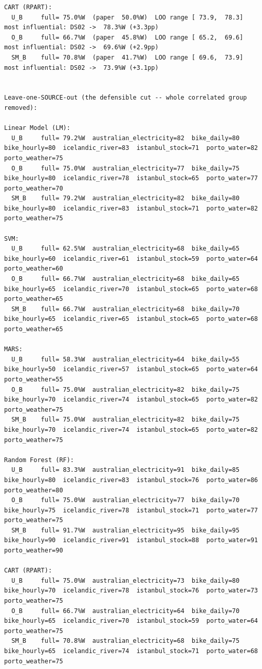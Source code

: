 \begin{verbatim}
CART (RPART):
  U_B     full= 75.0%W  (paper  50.0%W)  LOO range [ 73.9,  78.3]  most influential: DS02 ->  78.3%W (+3.3pp)
  O_B     full= 66.7%W  (paper  45.8%W)  LOO range [ 65.2,  69.6]  most influential: DS02 ->  69.6%W (+2.9pp)
  SM_B    full= 70.8%W  (paper  41.7%W)  LOO range [ 69.6,  73.9]  most influential: DS02 ->  73.9%W (+3.1pp)


Leave-one-SOURCE-out (the defensible cut -- whole correlated group removed):

Linear Model (LM):
  U_B     full= 79.2%W  australian_electricity=82  bike_daily=80  bike_hourly=80  icelandic_river=83  istanbul_stock=71  porto_water=82  porto_weather=75
  O_B     full= 75.0%W  australian_electricity=77  bike_daily=75  bike_hourly=80  icelandic_river=78  istanbul_stock=65  porto_water=77  porto_weather=70
  SM_B    full= 79.2%W  australian_electricity=82  bike_daily=80  bike_hourly=80  icelandic_river=83  istanbul_stock=71  porto_water=82  porto_weather=75

SVM:
  U_B     full= 62.5%W  australian_electricity=68  bike_daily=65  bike_hourly=60  icelandic_river=61  istanbul_stock=59  porto_water=64  porto_weather=60
  O_B     full= 66.7%W  australian_electricity=68  bike_daily=65  bike_hourly=65  icelandic_river=70  istanbul_stock=65  porto_water=68  porto_weather=65
  SM_B    full= 66.7%W  australian_electricity=68  bike_daily=70  bike_hourly=65  icelandic_river=65  istanbul_stock=65  porto_water=68  porto_weather=65

MARS:
  U_B     full= 58.3%W  australian_electricity=64  bike_daily=55  bike_hourly=50  icelandic_river=57  istanbul_stock=65  porto_water=64  porto_weather=55
  O_B     full= 75.0%W  australian_electricity=82  bike_daily=75  bike_hourly=70  icelandic_river=74  istanbul_stock=65  porto_water=82  porto_weather=75
  SM_B    full= 75.0%W  australian_electricity=82  bike_daily=75  bike_hourly=70  icelandic_river=74  istanbul_stock=65  porto_water=82  porto_weather=75

Random Forest (RF):
  U_B     full= 83.3%W  australian_electricity=91  bike_daily=85  bike_hourly=80  icelandic_river=83  istanbul_stock=76  porto_water=86  porto_weather=80
  O_B     full= 75.0%W  australian_electricity=77  bike_daily=70  bike_hourly=75  icelandic_river=78  istanbul_stock=71  porto_water=77  porto_weather=75
  SM_B    full= 91.7%W  australian_electricity=95  bike_daily=95  bike_hourly=90  icelandic_river=91  istanbul_stock=88  porto_water=91  porto_weather=90

CART (RPART):
  U_B     full= 75.0%W  australian_electricity=73  bike_daily=80  bike_hourly=70  icelandic_river=78  istanbul_stock=76  porto_water=73  porto_weather=75
  O_B     full= 66.7%W  australian_electricity=64  bike_daily=70  bike_hourly=65  icelandic_river=70  istanbul_stock=59  porto_water=64  porto_weather=75
  SM_B    full= 70.8%W  australian_electricity=68  bike_daily=75  bike_hourly=65  icelandic_river=74  istanbul_stock=71  porto_water=68  porto_weather=75



\end{verbatim}
